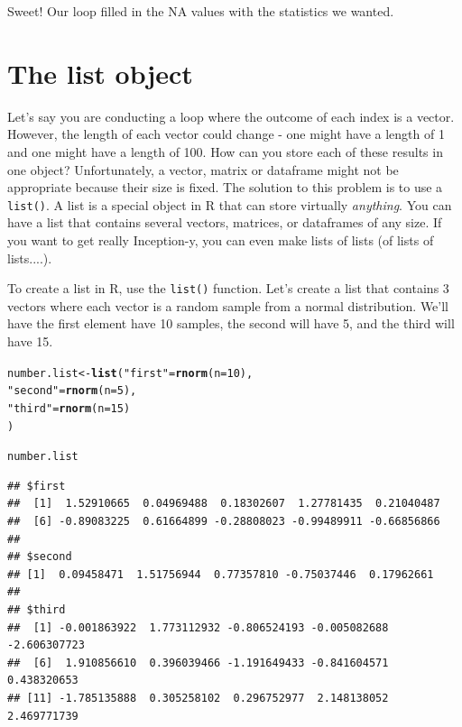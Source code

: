 \documentclass{tufte-book}\usepackage[]{graphicx}\usepackage[]{color}
\makeatletter
\newcommand{\hlnum}[1]{\textcolor[rgb]{0.686,0.059,0.569}{#1}}%
\newcommand{\hlstr}[1]{\textcolor[rgb]{0.192,0.494,0.8}{#1}}%
\newcommand{\hlstd}[1]{\textcolor[rgb]{0.345,0.345,0.345}{#1}}%
\newcommand{\hlkwb}[1]{\textcolor[rgb]{0.69,0.353,0.396}{#1}}%
\newcommand{\hlkwc}[1]{\textcolor[rgb]{0.333,0.667,0.333}{#1}}%
\newcommand{\hlkwd}[1]{\textcolor[rgb]{0.737,0.353,0.396}{\textbf{#1}}}%
\newenvironment{kframe}{%
 \def\at@end@of@kframe{}%
 \ifinner\ifhmode%
  \def\at@end@of@kframe{\end{minipage}}%
  \begin{minipage}{\columnwidth}%
 \fi\fi%
 \def\FrameCommand##1{\hskip\@totalleftmargin \hskip-\fboxsep
 \colorbox{shadecolor}{##1}\hskip-\fboxsep
     \hskip-\linewidth \hskip-\@totalleftmargin \hskip\columnwidth}%
 \MakeFramed {\advance\hsize-\width
   \@totalleftmargin\z@ \linewidth\hsize
   \@setminipage}}%
 {\par\unskip\endMakeFramed%
 \at@end@of@kframe}
\newenvironment{knitrout}{}{} %
\makeatother
\begin{document}
\begin{footnotesize}
Sweet! Our loop filled in the NA values with the statistics we wanted.

\section{The list object}

Let's say you are conducting a loop where the outcome of each index is a vector. However, the length of each vector could change - one might have a length of 1 and one might have a length of 100. How can you store each of these results in one object? Unfortunately, a vector, matrix or dataframe might not be appropriate because their size is fixed. The solution to this problem is to use a \texttt{list()}. A list is a special object in R that can store virtually \textit{anything}. You can have a list that contains several vectors, matrices, or dataframes of any size. If you want to get really Inception-y, you can even make lists of lists (of lists of lists....).

To create a list in R, use the \texttt{list()} function. Let's create a list that contains 3 vectors where each vector is a random sample from a normal distribution. We'll have the first element have 10 samples, the second will have 5, and the third will have 15.

\begin{knitrout}
\color{fgcolor}\begin{kframe}
\begin{alltt}
\hlstd{number.list} \hlkwb{<-} \hlkwd{list}\hlstd{(}\hlstr{"first"} \hlstd{=} \hlkwd{rnorm}\hlstd{(}\hlkwc{n} \hlstd{=} \hlnum{10}\hlstd{),}
     \hlstr{"second"} \hlstd{=} \hlkwd{rnorm}\hlstd{(}\hlkwc{n} \hlstd{=} \hlnum{5}\hlstd{),}
     \hlstr{"third"} \hlstd{=} \hlkwd{rnorm}\hlstd{(}\hlkwc{n} \hlstd{=} \hlnum{15}\hlstd{)}
\hlstd{)}

\hlstd{number.list}
\end{alltt}
\begin{verbatim}
## $first
##  [1]  1.52910665  0.04969488  0.18302607  1.27781435  0.21040487
##  [6] -0.89083225  0.61664899 -0.28808023 -0.99489911 -0.66856866
## 
## $second
## [1]  0.09458471  1.51756944  0.77357810 -0.75037446  0.17962661
## 
## $third
##  [1] -0.001863922  1.773112932 -0.806524193 -0.005082688 -2.606307723
##  [6]  1.910856610  0.396039466 -1.191649433 -0.841604571  0.438320653
## [11] -1.785135888  0.305258102  0.296752977  2.148138052  2.469771739
\end{verbatim}
\end{kframe}
\end{knitrout}


\end{footnotesize}
\end{document}
